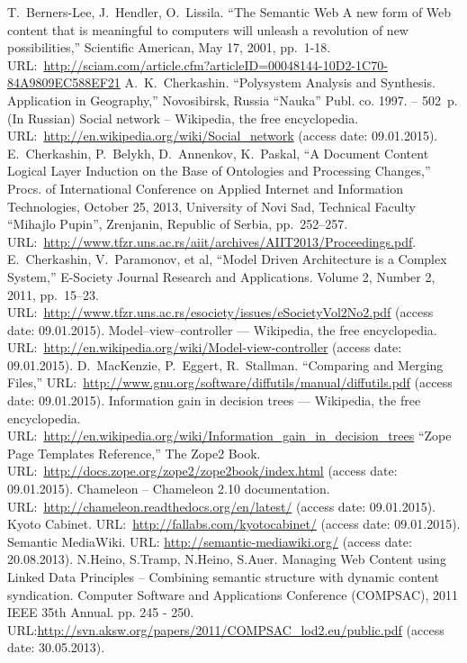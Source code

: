 \documentclass[conference]{IEEEtran}
\begin{document}
\begin{thebibliography}{11}
 T.~Berners-Lee, J.~Hendler, O.~Lissila. ``The
  Semantic Web A new form of Web content that is meaningful to
  computers will unleash a revolution of new possibilities,''
  Scientific American, May 17, 2001,
  pp.~1-18. URL:~\url{http://sciam.com/article.cfm?articleID=00048144-10D2-1C70-84A9809EC588EF21}
 A.~K.~Cherkashin. ``Polysystem Analysis and
  Synthesis. Application in Geography,'' Novosibirsk, Russia ``Nauka'' Publ. co.
  1997. -- 502~p. (In Russian)
 Social network -- Wikipedia, the free encyclopedia.
  URL:~\url{http://en.wikipedia.org/wiki/Social_network} (access date: 09.01.2015).
 E.~Cherkashin, P.~Belykh, D.~Annenkov, K.~Paskal, ``A
  Document Content Logical Layer Induction on the Base of Ontologies
  and Processing Changes,'' Procs. of International Conference on
  Applied Internet and Information Technologies, October 25, 2013,
  University of Novi Sad, Technical Faculty ``Mihajlo Pupin'',
  Zrenjanin, Republic of Serbia,
  pp.~252--257. URL:~\url{http://www.tfzr.uns.ac.rs/aiit/archives/AIIT2013/Proceedings.pdf}.
 E.~Cherkashin, V.~Paramonov, et al, ``Model Driven
  Architecture is a Complex System,'' E-Society Journal Research and
  Applications. Volume 2, Number 2, 2011, pp.~15--23.
  URL:~\url{http://www.tfzr.uns.ac.rs/esociety/issues/eSocietyVol2No2.pdf} (access date: 09.01.2015).
 Model--view--controller --- Wikipedia, the free
  encyclopedia.
  URL:~\url{http://en.wikipedia.org/wiki/Model-view-controller} (access date: 09.01.2015).
 D.~MacKenzie, P.~Eggert, R.~Stallman. ``Comparing and
  Merging Files,''
  URL:~\url{http://www.gnu.org/software/diffutils/manual/diffutils.pdf} (access date: 09.01.2015).
 Information gain in decision trees ---  Wikipedia, the free
  encyclopedia. URL:~\url{http://en.wikipedia.org/wiki/Information_gain_in_decision_trees}
 ``Zope Page Templates Reference,'' The Zope2 Book. URL:~\url{http://docs.zope.org/zope2/zope2book/index.html} (access date: 09.01.2015).
 Chameleon -- Chameleon 2.10 documentation.
  URL:~\url{http://chameleon.readthedocs.org/en/latest/}  (access date: 09.01.2015).
 Kyoto Cabinet. URL:~\url{http://fallabs.com/kyotocabinet/} (access date: 09.01.2015).
 Semantic MediaWiki. URL: \url{http://semantic-mediawiki.org/} (access date: 20.08.2013).
 N.Heino, S.Tramp, N.Heino, S.Auer. Managing Web Content using Linked Data Principles – Combining semantic structure with dynamic content syndication. Computer Software and Applications Conference (COMPSAC), 2011 IEEE 35th Annual. pp. 245 - 250. URL:\url{http://svn.aksw.org/papers/2011/COMPSAC_lod2.eu/public.pdf} (access date: 30.05.2013).

\end{thebibliography}
\vspace{-2em}\mbox{} %
\end{document}
